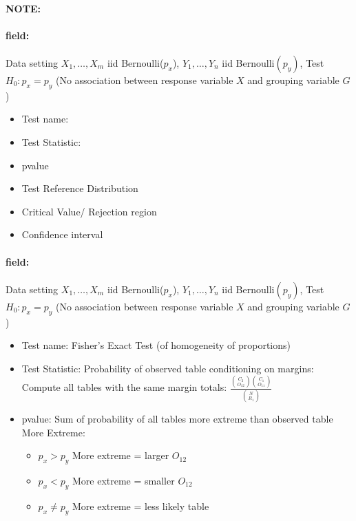 \documentclass[12pt]{article}
\newenvironment{note}{\paragraph{NOTE:}}{}
\newenvironment{field}{\paragraph{field:}}{}
\begin{document}
\begin{note}
 \begin{field}
  Data setting $X_1, \ldots , X_m$ iid Bernoulli($p_x$), $Y_1, \ldots, Y_n$ iid Bernoulli$(p_y)$, Test $H_0: p_x = p_y $ (No association between response variable $X$ and grouping variable $G$)
  \begin{itemize}
   \item Test name:
   \item Test Statistic:
   \item pvalue
   \item Test Reference Distribution
   \item Critical Value/ Rejection region
   \item Confidence interval
  \end{itemize}
 \end{field}
 \begin{field}
  Data setting $X_1, \ldots , X_m$ iid Bernoulli($p_x$), $Y_1, \ldots, Y_n$ iid Bernoulli$(p_y)$, Test $H_0: p_x = p_y $ (No association between response variable $X$ and grouping variable $G$)
  \begin{itemize}
   \item Test name: Fisher's Exact Test (of homogeneity of proportions)
   \item Test Statistic: Probability of observed table conditioning on margins: Compute all tables with the same margin totals: $\frac{\binom{C_2}{O_{12}}\binom{C_1}{O_{11}}}{\binom{N}{R_1}}$
   \item pvalue: Sum of probability of all tables more extreme than observed table
         More Extreme:
         \begin{itemize}
          \item $p_x > p_y$ More extreme = larger $O_{12}$
          \item $p_x < p_y$ More extreme = smaller $O_{12}$
          \item $p_x \neq p_y$ More extreme = less likely table
         \end{itemize}
  \end{itemize}
 \end{field}
\end{note}
\end{document}
